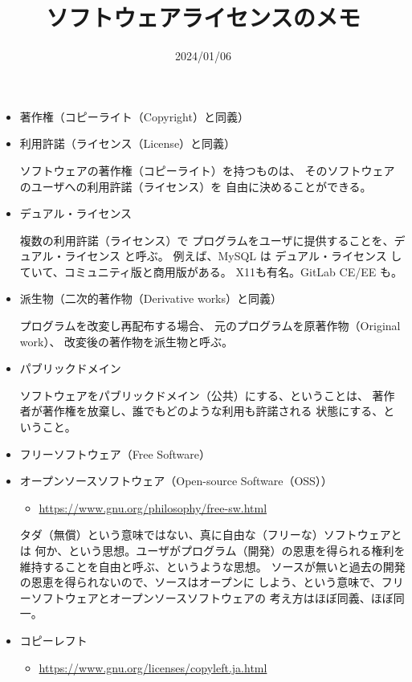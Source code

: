 \documentclass{jsarticle}
\title{ソフトウェアライセンスのメモ}
\author{}
\date{2024/01/06}
\newcommand{\copyrightname}{著作権}
\newcommand{\copyrightalt}{コピーライト}
\newcommand{\license}{利用許諾}
\newcommand{\licensealt}{ライセンス}
\newcommand{\duallicense}{デュアル・ライセンス}
\newcommand{\derivative}{派生物}
\newcommand{\derivativealt}{二次的著作物}
\newcommand{\freesoftware}{フリーソフトウェア}
\newcommand{\opensourcesoftware}{オープンソースソフトウェア}
\newcommand{\copyleft}{コピーレフト}
\begin{document}
\maketitle

\begin{itemize}

\item \copyrightname{}（\copyrightalt{}（Copyright）と同義）
\item \license{}（\licensealt{}（License）と同義）

ソフトウェアの\copyrightname{}（\copyrightalt{}）を持つものは、
そのソフトウェアのユーザへの\license{}（\licensealt{}）を
自由に決めることができる。

\item \duallicense{}

複数の\license（\licensealt{}）で
プログラムをユーザに提供することを、\duallicense{} と呼ぶ。
例えば、MySQL は \duallicense{} していて、コミュニティ版と商用版がある。
X11も有名。GitLab CE/EE も。

\item \derivative{}（\derivativealt{}（Derivative works）と同義）

プログラムを改変し再配布する場合、
元のプログラムを原著作物（Original work）、
改変後の著作物を\derivative{}と呼ぶ。

\item パブリックドメイン

ソフトウェアをパブリックドメイン（公共）にする、ということは、
著作者が著作権を放棄し、誰でもどのような利用も許諾される
状態にする、ということ。

\item \freesoftware{}（Free Software）
\item \opensourcesoftware{}（Open-source Software（OSS））
\begin{itemize}
\item \url{https://www.gnu.org/philosophy/free-sw.html}
\end{itemize}

タダ（無償）という意味ではない、真に自由な（フリーな）ソフトウェアとは
何か、という思想。ユーザがプログラム（開発）の恩恵を得られる権利を
維持することを自由と呼ぶ、というような思想。
ソースが無いと過去の開発の恩恵を得られないので、ソースはオープンに
しよう、という意味で、\freesoftware{}と\opensourcesoftware{}の
考え方はほぼ同義、ほぼ同一。

\item \copyleft{}
\begin{itemize}
\item \url{https://www.gnu.org/licenses/copyleft.ja.html}
\end{itemize}


\end{itemize}
\end{document}
